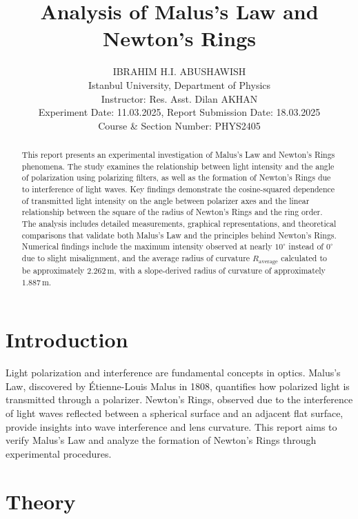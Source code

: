 \documentclass[journal]{IEEEtran}
\begin{document}
 
\title{Analysis of Malus's Law and Newton's Rings}
\author{IBRAHIM H.I. ABUSHAWISH \\
Istanbul University, Department of Physics \\
Instructor: Res. Asst. Dilan AKHAN \\
Experiment Date: 11.03.2025, Report Submission Date: 18.03.2025\\
Course \& Section Number: PHYS2405}

\maketitle
\begin{abstract}
    This report presents an experimental investigation of Malus's Law and Newton's Rings phenomena. The study examines the relationship between light intensity and the angle of polarization using polarizing filters, as well as the formation of Newton's Rings due to interference of light waves. Key findings demonstrate the cosine-squared dependence of transmitted light intensity on the angle between polarizer axes and the linear relationship between the square of the radius of Newton's Rings and the ring order. The analysis includes detailed measurements, graphical representations, and theoretical comparisons that validate both Malus's Law and the principles behind Newton's Rings. Numerical findings include the maximum intensity observed at nearly $10^\circ$ instead of $0^\circ$ due to slight misalignment, and the average radius of curvature $R_{\text{average}}$ calculated to be approximately $2.262 \, \text{m}$, with a slope-derived radius of curvature of approximately $1.887 \, \text{m}$.
\end{abstract}
\section{Introduction}
Light polarization and interference are fundamental concepts in optics. Malus's Law, discovered by Étienne-Louis Malus in 1808, quantifies how polarized light is transmitted through a polarizer. Newton's Rings, observed due to the interference of light waves reflected between a spherical surface and an adjacent flat surface, provide insights into wave interference and lens curvature. This report aims to verify Malus's Law and analyze the formation of Newton's Rings through experimental procedures.

\section{Theory}
\end{document}

